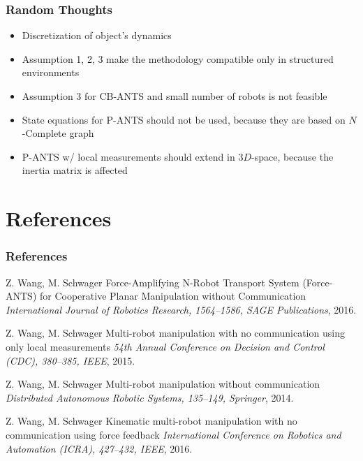 \documentclass{beamer}
\begin{document}
\begin{frame}
\frametitle{Random Thoughts}
\begin{itemize}
\item Discretization of object's dynamics\vspace{.2cm}
\item Assumption 1, 2, 3 make the methodology compatible only in structured environments\vspace{.2cm}
\item Assumption 3 for CB-ANTS and small number of robots is not feasible\vspace{.2cm}
\item State equations for P-ANTS should not be used, because they are based on $N$-Complete graph \vspace{.2cm}
\item P-ANTS w/ local measurements should extend in 3$D$-space, because the inertia matrix is affected\vspace{.2cm}
\end{itemize}
\end{frame}







\section{References}

\begin{frame}
\frametitle{References}
\tiny{
\begin{thebibliography}{99} %


 Z. Wang, M. Schwager
\newblock Force-Amplifying N-Robot Transport System (Force-ANTS) for Cooperative Planar Manipulation without Communication
\newblock \emph{International Journal of Robotics Research, 1564--1586, SAGE Publications}, 2016.

 Z. Wang, M. Schwager
\newblock Multi-robot manipulation with no communication using only local measurements
\newblock \emph{54th Annual Conference on Decision and Control (CDC), 380--385, IEEE}, 2015.

 Z. Wang, M. Schwager
\newblock Multi-robot manipulation without communication
\newblock \emph{Distributed Autonomous Robotic Systems, 135--149, Springer}, 2014.

 Z. Wang, M. Schwager
\newblock Kinematic multi-robot manipulation with no communication using force feedback
\newblock \emph{International Conference on Robotics and Automation (ICRA), 427--432, IEEE}, 2016.


\end{thebibliography}
}
\end{frame}
\end{document}
